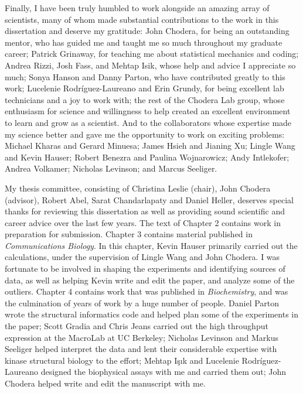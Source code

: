 \documentclass[phd,tocprelim]{cornell}
\begin{document}
\begin{acknowledgements}
Finally, I have been truly humbled to work alongside an amazing array of scientists, many of whom made substantial contributions to the work in this dissertation and deserve my gratitude: John Chodera, for being an outstanding mentor, who has guided me and taught me so much throughout my graduate career; Patrick Grinaway, for teaching me about statistical mechanics and coding; Andrea Rizzi, Josh Fass, and Mehtap Isik, whose help and advice I appreciate so much; Sonya Hanson and Danny Parton, who have contributed greatly to this work; Lucelenie Rodr\'{i}guez-Laureano and Erin Grundy, for being excellent lab technicians and a joy to work with; the rest of the Chodera Lab group, whose enthusiasm for science and willingness to help created an excellent environment to learn and grow as a scientist. And to the collaborators whose expertise made my science better and gave me the opportunity to work on exciting problems: Michael Kharas and Gerard Minuesa; James Hsieh and Jianing Xu; Lingle Wang and Kevin Hauser; Robert Benezra and Paulina Wojnarowicz; Andy Intlekofer; Andrea Volkamer; Nicholas Levinson; and Marcus Seeliger. 

My thesis committee, consisting of Christina Leslie (chair), John Chodera (advisor), Robert Abel, Sarat Chandarlapaty and Daniel Heller, deserves special thanks for reviewing this dissertation as well as providing sound scientific and career advice over the last few years. The text of Chapter 2 contains work in preparation for submission. Chapter 3 contains material published in \emph{Communications Biology}. In this chapter, Kevin Hauser primarily carried out the calculations, under the supervision of Lingle Wang and John Chodera. I was fortunate to be involved in shaping the experiments and identifying sources of data, as well as helping Kevin write and edit the paper, and analyze some of the outliers. Chapter 4 contains work that was published in \emph{Biochemistry}, and was the culmination of years of work by a huge number of people. Daniel Parton wrote the structural informatics code and helped plan some of the experiments in the paper; Scott Gradia and Chris Jeans carried out the high throughput expression at the MacroLab at UC Berkeley; Nicholas Levinson and Markus Seeliger helped interpret the data and lent their considerable expertise with kinase structural biology to the effort; Mehtap Işık and Lucelenie Rodr\'{i}guez-Laureano designed the biophysical assays with me and carried them out; John Chodera helped write and edit the manuscript with me. 





\end{acknowledgements}
\end{document}
